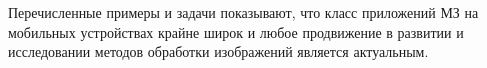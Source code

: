 Перечисленные примеры и задачи показывают, что класс приложений МЗ на мобильных устройствах крайне широк и любое продвижение в развитии и исследовании методов обработки изображений является актуальным.

